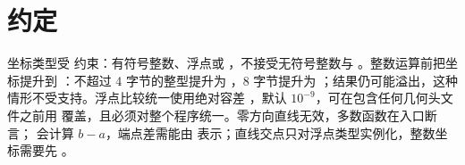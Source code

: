\section{约定}

坐标类型受  约束：有符号整数、浮点或 ，不接受无符号整数与 。整数运算前把坐标提升到 ：不超过 4 字节的整型提升为 ，8 字节提升为 ；结果仍可能溢出，这种情形不受支持。浮点比较统一使用绝对容差 ，默认 $10^{-9}$，可在包含任何几何头文件之前用  覆盖，且必须对整个程序统一。零方向直线无效，多数函数在入口断言； 会计算 $b-a$，端点差需能由  表示；直线交点只对浮点类型实例化，整数坐标需要先 。

